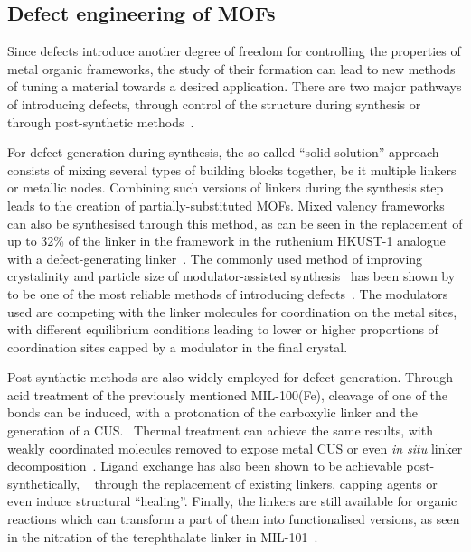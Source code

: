 \subsection{Defect engineering of MOFs}

Since defects introduce another degree of freedom
for controlling the properties of metal organic frameworks, the
study of their formation can lead to new methods of tuning
a material towards a desired application.
There are two major pathways of introducing defects, through
control of the structure during synthesis or through post-synthetic
methods~\cite{fangDefectEngineeredMetalOrganicFrameworks2015}.

For defect generation during synthesis, the so called
``solid solution'' approach consists of mixing several types of
building blocks together, be it multiple linkers or
metallic nodes. Combining such versions of linkers during the 
synthesis step leads to the creation of partially-substituted \glspl{MOF}.
Mixed valency frameworks can also be synthesised through
this method, as can be seen in the replacement of up to 32\% of the
linker in the framework in the ruthenium HKUST-1
analogue with a defect-generating
linker~\cite{zhangRutheniumMetalOrganicFrameworks2016}.
The commonly used method of improving crystalinity and
particle size of modulator-assisted
synthesis~\cite{schaateModulatedSynthesisZrBased2011} has been shown
by~\citeauthor{shearerDefectEngineeringTuning2016}
to be one of the most reliable methods of introducing
defects~\cite{shearerDefectEngineeringTuning2016}.
The modulators used are competing with the linker molecules
for coordination on the metal sites, with different equilibrium 
conditions leading to lower or higher proportions of coordination
sites capped by a modulator in the final crystal. 

Post-synthetic methods are also widely employed for defect
generation. Through acid treatment of the previously mentioned
MIL-100(Fe), cleavage of one of the  bonds can be
induced, with a protonation of the carboxylic linker and the
generation of a \gls{CUS}.~\cite{vermoorteleTuningCatalyticPerformance2012}
Thermal treatment can achieve the same results, with weakly coordinated
molecules removed to expose metal \gls{CUS} or even \textit{in situ}
linker decomposition~\cite{gadipelliPostsynthesisAnnealingMOF52014}.
Ligand exchange has also been shown to be achievable post-synthetically,
~\cite{shearerFunctionalizingDefectsPostsynthetic2016} through the
replacement of existing linkers, capping agents or even induce
structural ``healing''. Finally, the linkers are still available 
for organic reactions which can transform a part of them into
functionalised versions, as seen in the nitration of the 
terephthalate linker in MIL-101~\cite{berntDirectCovalentPostsynthetic2011}.

